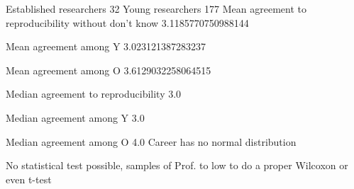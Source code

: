 Established researchers 32
Young researchers 177
Mean agreement to reproducibility without don't know 3.1185770750988144

Mean agreement among Y 3.023121387283237

Mean agreement among O 3.6129032258064515

Median agreement to reproducibility 3.0

Median agreement among Y 3.0

Median agreement among O 4.0
Career has no normal distribution

No statistical test possible, samples of Prof. to low to do a proper Wilcoxon or even t-test
